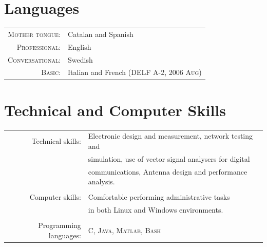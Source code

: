\documentclass[a4paper,10pt]{article}
\begin{document}

  \section{Languages}

    \begin{tabular}{rl}
      
      \textsc{Mother tongue:} & Catalan and Spanish \\
      
      \textsc{Professional:} & English \\
      
      \textsc{Conversational:} & Swedish \\
      
      \textsc{Basic:} & Italian and French (\textsc{DELF} A-2, \textsc{2006 Aug})
      
    \end{tabular}


  \section{Technical and Computer Skills}

  \begin{tabular}{rl}
  Technical skills: & Electronic design and measurement, network testing and \\
  & simulation, use of vector signal analysers for digital  \\
  & communications, Antenna design and performance analysis. \\
  &\\
  Computer skills:& Comfortable performing administrative tasks \\
  & in both Linux and Windows environments. \\
  &\\
  Programming languages: & \textsc{C, Java, Matlab, Bash } \\

  \end{tabular}
\end{document}
